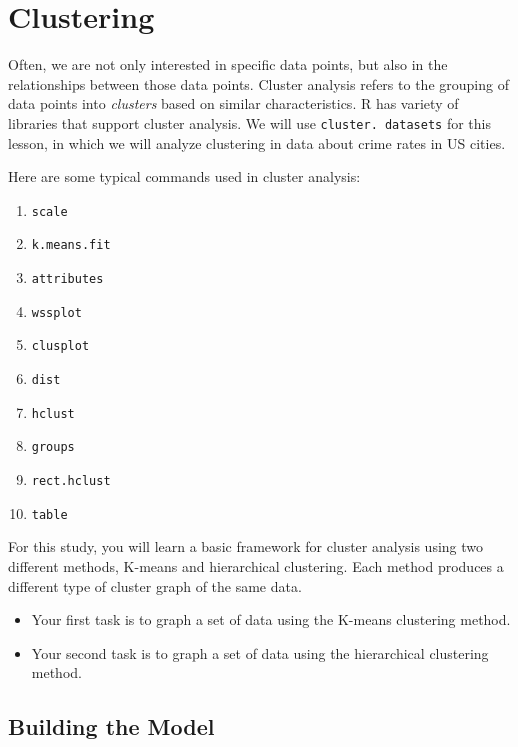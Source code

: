 \chapter{Clustering}

Often, we are not only interested in specific data points, but also in the relationships between those data points.
Cluster analysis refers to the grouping of data points into \emph{clusters} based on similar characteristics.
R has variety of libraries that support cluster analysis.
We will use \texttt{cluster.
datasets} for this lesson, in which we will analyze clustering in data about crime rates in US cities. \cite{Novomestky}
\medskip

Here are some typical commands used in cluster analysis:

\begin{enumerate}
\item \texttt{scale}
\item \texttt{k.means.fit}
\item \texttt{attributes}
\item \texttt{wssplot}
\item \texttt{clusplot}
\item \texttt{dist}
\item \texttt{hclust}
\item \texttt{groups}
\item \texttt{rect.hclust}
\item \texttt{table}

\end{enumerate}


For this study, you will learn a basic framework for cluster analysis using two different methods, K-means and hierarchical clustering.
Each method produces a different type of cluster graph of the same data. 

\begin{itemize}

\item Your first task is to graph a set of data using the K-means clustering method.

\item Your second task is to graph a set of data using the hierarchical clustering method. 
 
\end{itemize}

\section{Building the Model}

